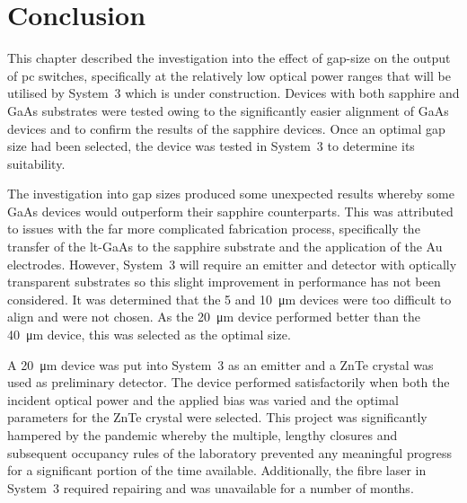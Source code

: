 \section{Conclusion}
This chapter described the investigation into the effect of gap\nobreakdash-size on the output of \acrshort{pc} switches, specifically at the relatively low optical power ranges that will be utilised by System~3 which is under construction. Devices with both sapphire and GaAs substrates were tested owing to the significantly easier alignment of GaAs devices and to confirm the results of the sapphire devices. Once an optimal gap size had been selected, the device was tested in System~3 to determine its suitability.

The investigation into gap sizes produced some unexpected results whereby some GaAs devices would outperform their sapphire counterparts. This was attributed to issues with the far more complicated fabrication process, specifically the transfer of the \acrshort{lt}\nobreakdash-GaAs to the sapphire substrate and the application of the Au electrodes. However, System~3 will require an emitter and detector with optically transparent substrates so this slight improvement in performance has not been considered. It was determined that the 5 and \SI{10}{\micro\metre} devices were too difficult to align and were not chosen. As the \SI{20}{\micro\metre} device performed better than the \SI{40}{\micro\metre} device, this was selected as the optimal size.

A \SI{20}{\micro\metre} device was put into System~3 as an emitter and a ZnTe crystal was used as preliminary detector. The device performed satisfactorily when both the incident optical power and the applied bias was varied and the optimal parameters for the ZnTe crystal were selected. This project was significantly hampered by the pandemic whereby the multiple, lengthy closures and subsequent occupancy rules of the laboratory prevented any meaningful progress for a significant portion of the time available. Additionally, the fibre laser in System~3 required repairing and was unavailable for a number of months.


